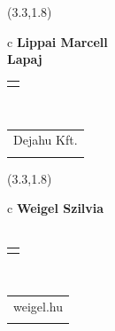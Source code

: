 \documentclass[11pt]{article}
\begin{document}
\makebox(3.3,1.8){
  \renewcommand\arraystretch{1.3}
  \begin{tabular}[c]{c}
    \hspace{8.5mm}
    \LARGE\bf{ Lippai Marcell }\\
    \hspace{8.5mm}
    \Large{ Lapaj }\\
    \renewcommand\arraystretch{3}
    \begin{tabular}[c]{c}
      \centering
      \fontfamily{phv}\selectfont{
        \textbf{
          \textsc{
            \scriptsize{
            \color{Bright}{ Ismerkedő }\color{Dark}{ Webmester }\color{Bright}{ Sminkmester }\color{Bright}{ Programozó }
            }
          }
        }
      }
    \end{tabular}
    \\
    \renewcommand\arraystretch{1}
    \begin{tabular}{p{3.3in}}
      \hspace{.7cm}Dejahu Kft.\\
      \hspace{.7cm}\emph{  }\\
    \end{tabular}
  \end{tabular}
}

\makebox(3.3,1.8){
  \renewcommand\arraystretch{1.3}
  \begin{tabular}[c]{c}
    \hspace{8.5mm}
    \LARGE\bf{ Weigel Szilvia }\\
    \hspace{8.5mm}
    \Large{  }\\
    \renewcommand\arraystretch{3}
    \begin{tabular}[c]{c}
      \centering
      \fontfamily{phv}\selectfont{
        \textbf{
          \textsc{
            \scriptsize{
            \color{Dark}{ Ismerkedő }\color{Bright}{ Webmester }\color{Bright}{ Sminkmester }\color{Bright}{ Programozó }
            }
          }
        }
      }
    \end{tabular}
    \\
    \renewcommand\arraystretch{1}
    \begin{tabular}{p{3.3in}}
      \hspace{.7cm}weigel.hu\\
      \hspace{.7cm}\emph{  }\\
    \end{tabular}
  \end{tabular}
}
\end{document}
